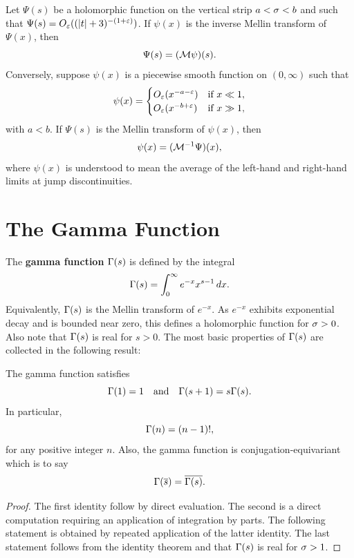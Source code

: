     \begin{theorem*}
      Let \(\Psi(s)\) be a holomorphic function on the vertical strip \(a < \sigma < b\) and such that \(\Psi(s) = O_{\varepsilon}((|t|+3)^{-(1+\varepsilon)})\). If \(\psi(x)\) is the inverse Mellin transform of \(\Psi(x)\), then
      \[
        \Psi(s) = (\mathcal{M}\psi)(s).
      \]
      Conversely, suppose \(\psi(x)\) is a piecewise smooth function on \((0,\infty)\) such that
      \[
        \psi(x) = \begin{cases} O_{\varepsilon}(x^{-a-\varepsilon}) & \text{if \(x \ll 1\)}, \\ O_{\varepsilon}(x^{-b+\varepsilon}) & \text{if \(x \gg 1\)}, \end{cases}
      \]
      with \(a < b\). If \(\Psi(s)\) is the Mellin transform of \(\psi(x)\), then
      \[
        \psi(x) = (\mathcal{M}^{-1}\Psi)(x),
      \]
      where \(\psi(x)\) is understood to mean the average of the left-hand and right-hand limits at jump discontinuities.
    \end{theorem*}
  \section{The Gamma Function}\label{sec:the_gamma_function}
    The \textbf{gamma function} \(\Gamma(s)\) is defined by the integral
    \[
      \Gamma(s) = \int_{0}^{\infty}e^{-x}x^{s-1}\,dx.
    \]
    Equivalently, \(\Gamma(s)\) is the Mellin transform of \(e^{-x}\). As \(e^{-x}\) exhibits exponential decay and is bounded near zero, this defines a holomorphic function for \(\sigma > 0\). Also note that \(\Gamma(s)\) is real for \(s > 0\). The most basic properties of \(\Gamma(s)\) are collected in the following result:

    \begin{proposition}\label{prop:Factorial_properties_of_gamma_function}
      The gamma function satisfies
      \[
        \Gamma(1) = 1 \quad \text{and} \quad \Gamma(s+1) = s\Gamma(s).
      \]
      In particular,
      \[
        \Gamma(n) = (n-1)!,
      \]
      for any positive integer \(n\). Also, the gamma function is conjugation-equivariant which is to say
      \[
        \Gamma(\overline{s}) = \overline{\Gamma(s)}.
      \]
    \end{proposition}
    \begin{proof}
      The first identity follow by direct evaluation. The second is a direct computation requiring an application of integration by parts. The following statement is obtained by repeated application of the latter identity. The last statement follows from the identity theorem and that \(\Gamma(s)\) is real for \(\sigma > 1\).
    \end{proof}

